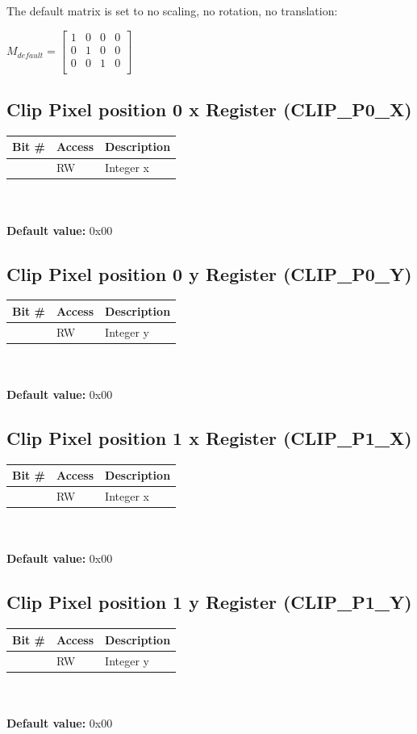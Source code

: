 \documentclass[10pt,a4paper]{article}
\begin{document}
The default matrix is set to no scaling, no rotation, no translation:

$
M_{default}
=
\left[
\begin{array}{cccc}
1 & 0 & 0 & 0 \\ 
0 & 1 & 0 & 0 \\ 
0 & 0 & 1 & 0 \\
\end{array}
\right]
$

\subsection{Clip Pixel position 0 x Register (CLIP\_P0\_X)}
\begin{tabular}{|l|l|l|}
\hline \textbf{Bit \#} & \textbf{Access} & \textbf{Description} \\ 
\hline
\hline [31:0] & RW & Integer x \\
\hline 
\end{tabular}
\\\\
\textbf{Default value:} 0x00

\subsection{Clip Pixel position 0 y Register (CLIP\_P0\_Y)}
\begin{tabular}{|l|l|l|}
\hline \textbf{Bit \#} & \textbf{Access} & \textbf{Description} \\ 
\hline
\hline [31:0] & RW & Integer y \\
\hline 
\end{tabular}
\\\\
\textbf{Default value:} 0x00

\subsection{Clip Pixel position 1 x Register (CLIP\_P1\_X)}
\begin{tabular}{|l|l|l|}
\hline \textbf{Bit \#} & \textbf{Access} & \textbf{Description} \\ 
\hline
\hline [31:0] & RW & Integer x \\
\hline 
\end{tabular}
\\\\
\textbf{Default value:} 0x00

\subsection{Clip Pixel position 1 y Register (CLIP\_P1\_Y)}
\begin{tabular}{|l|l|l|}
\hline \textbf{Bit \#} & \textbf{Access} & \textbf{Description} \\ 
\hline
\hline [31:0] & RW & Integer y \\
\hline 
\end{tabular}
\\\\
\textbf{Default value:} 0x00
\end{document}
